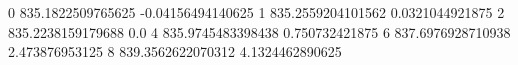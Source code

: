 0 835.1822509765625 -0.04156494140625
1 835.2559204101562 0.0321044921875
2 835.2238159179688 0.0
4 835.9745483398438 0.750732421875
6 837.6976928710938 2.473876953125
8 839.3562622070312 4.1324462890625
